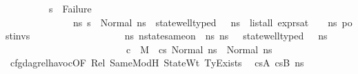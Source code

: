 \begin{isabellebody}
\ \ \ \ \ \ \ \ \ {\isachardoublequoteopen}s{\isacharprime}{\kern0pt}\ {\isasymnoteq}\ Failure\ {\isasymand}\ \isanewline
\ \ \ \ \ \ \ \ \ \ \ \ \ \ {\isacharparenleft}{\kern0pt}{\isasymforall}ns{}{\isacharprime}{\kern0pt}{\isachardot}{\kern0pt}\ s{\isacharprime}{\kern0pt}\ {\isacharequal}{\kern0pt}\ Normal\ ns{}{\isacharprime}{\kern0pt}\ {\isasymlongrightarrow}\ state{\isacharunderscore}{\kern0pt}well{\isacharunderscore}{\kern0pt}typed\ {\isasymLambda}\ {\isasymOmega}\ ns{}{\isacharprime}{\kern0pt}\ {\isasymand}\ list{\isacharunderscore}{\kern0pt}all\ {\isacharparenleft}{\kern0pt}expr{\isacharunderscore}{\kern0pt}sat\ {\isasymLambda}\ {\isasymGamma}\ {\isasymOmega}\ ns{}{\isacharprime}{\kern0pt}{\isacharparenright}{\kern0pt}\ post{\isacharunderscore}{\kern0pt}invs\ {\isasymand}\ \isanewline
\ \ \ \ \ \ \ \ \ \ \ \ \ \ \ \ \ {\isacharparenleft}{\kern0pt}{\isasymexists}ns{}{\isacharprime}{\kern0pt}{\isachardot}{\kern0pt}\ nstate{\isacharunderscore}{\kern0pt}same{\isacharunderscore}{\kern0pt}on\ {\isasymLambda}\ ns{}{\isacharprime}{\kern0pt}\ ns{}{\isacharprime}{\kern0pt}\ {\isacharbraceleft}{\kern0pt}{\isacharbraceright}{\kern0pt}\ {\isasymand}\ state{\isacharunderscore}{\kern0pt}well{\isacharunderscore}{\kern0pt}typed\ {\isasymLambda}\ {\isasymOmega}\ ns{}{\isacharprime}{\kern0pt}\ {\isasymand}\isanewline
\ \ \ \ \ \ \ \ \ \ \ \ \ \ \ \ \ \ \ \ \ \ \ \ \ {\isacharparenleft}{\kern0pt}{\isasymnot}c\ {\isasymlongrightarrow}\ {\isacharparenleft}{\kern0pt}M{\isacharcomma}{\kern0pt}{\isasymLambda}{\isacharcomma}{\kern0pt}{\isasymGamma}{\isacharcomma}{\kern0pt}{\isasymOmega}\ {\isasymturnstile}\ {\isasymlangle}cs{}{\isacharcomma}{\kern0pt}\ Normal\ ns{}{\isasymrangle}\ {\isacharbrackleft}{\kern0pt}{\isasymrightarrow}{\isacharbrackright}{\kern0pt}\ Normal\ ns{}{\isacharprime}{\kern0pt}{\isacharparenright}{\kern0pt}{\isacharparenright}{\kern0pt}{\isacharparenright}{\kern0pt}{\isacharparenright}{\kern0pt}{\isachardoublequoteclose}\isanewline
%
\isadelimproof
%
\endisadelimproof
%
\isatagproof
{}\isamarkupfalse%
\ {\isacharminus}{\kern0pt}\isanewline
\ \ \isamarkupfalse%
\ cfg{\isacharunderscore}{\kern0pt}dag{\isacharunderscore}{\kern0pt}rel{\isacharunderscore}{\kern0pt}havoc{\isacharbrackleft}{\kern0pt}OF\ Rel\ SameModH\ StateWt\ TyExists{\isacharbrackright}{\kern0pt}\ \isamarkupfalse%
\ cs{}A\ cs{}B\ ns{}{\isacharprime}{\kern0pt}\ \isanewline

\end{isabellebody}
